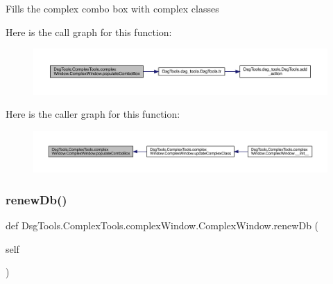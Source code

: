 \begin{DoxyVerb}Fills the complex combo box with complex classes
\end{DoxyVerb}
 Here is the call graph for this function\+:
\nopagebreak
\begin{figure}[H]
\begin{center}
\leavevmode
\includegraphics[width=350pt]{class_dsg_tools_1_1_complex_tools_1_1complex_window_1_1_complex_window_a9b2244418126aae98c5d05ef78848ca2_cgraph}
\end{center}
\end{figure}
Here is the caller graph for this function\+:
\nopagebreak
\begin{figure}[H]
\begin{center}
\leavevmode
\includegraphics[width=350pt]{class_dsg_tools_1_1_complex_tools_1_1complex_window_1_1_complex_window_a9b2244418126aae98c5d05ef78848ca2_icgraph}
\end{center}
\end{figure}
\mbox{\label{class_dsg_tools_1_1_complex_tools_1_1complex_window_1_1_complex_window_a3be29012c77571d5328439ee89b8404d}} 
\subsubsection{\texorpdfstring{renew\+Db()}{renewDb()}}
{\footnotesize\ttfamily def Dsg\+Tools.\+Complex\+Tools.\+complex\+Window.\+Complex\+Window.\+renew\+Db (\begin{DoxyParamCaption}\item[{}]{self }\end{DoxyParamCaption})}

